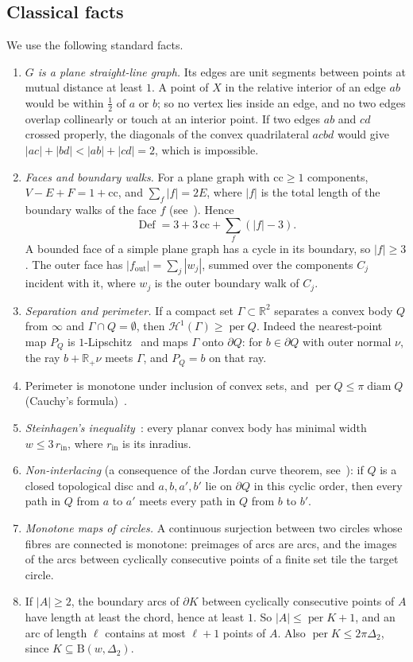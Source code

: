 \documentclass[11pt]{amsart}
\theoremstyle{definition}
\theoremstyle{remark}
\newcommand{\R}{\mathbb{R}}
\newcommand{\Dt}{\Delta_2}
\newcommand{\Dd}{\mathrm{B}}      %
\begin{document}
\subsection{Classical facts}
We use the following standard facts.
\begin{enumerate}[label=\textup{(P\arabic*)},leftmargin=3em]
\item \emph{$G$ is a plane straight-line graph.} Its edges are unit segments between points at mutual distance at least $1$. A point of $X$ in the relative interior of an edge $ab$ would be within $\frac12$ of $a$ or $b$; so no vertex lies inside an edge, and no two edges overlap collinearly or touch at an interior point. If two edges $ab$ and $cd$ crossed properly, the diagonals of the convex quadrilateral $acbd$ would give $|ac|+|bd|<|ab|+|cd|=2$, which is impossible.
\item \emph{Faces and boundary walks.} For a plane graph with $\mathrm{cc}\ge1$ components, $V-E+F=1+\mathrm{cc}$, and $\sum_f|f|=2E$, where $|f|$ is the total length of the boundary walks of the face $f$ (see~\cite{MoharThomassen}). Hence
\[
\operatorname{Def}=3+3\,\mathrm{cc}+\sum_f(|f|-3).
\]
A bounded face of a simple plane graph has a cycle in its boundary, so $|f|\ge3$. The outer face has $|f_{\mathrm{out}}|=\sum_j|w_j|$, summed over the components $C_j$ incident with it, where $w_j$ is the outer boundary walk of $C_j$.
\item \emph{Separation and perimeter.} If a compact set $\Gamma\subset\R^2$ separates a convex body $Q$ from $\infty$ and $\Gamma\cap Q=\emptyset$, then $\mathcal H^1(\Gamma)\ge\operatorname{per}Q$. Indeed the nearest-point map $P_Q$ is $1$-Lipschitz~\cite{Schneider} and maps $\Gamma$ onto $\partial Q$: for $b\in\partial Q$ with outer normal $\nu$, the ray $b+\R_+\nu$ meets $\Gamma$, and $P_Q=b$ on that ray.
\item Perimeter is monotone under inclusion of convex sets, and $\operatorname{per}Q\le\pi\operatorname{diam}Q$ (Cauchy's formula)~\cite{Schneider}.
\item \emph{Steinhagen's inequality}~\cite{Steinhagen}: every planar convex body has minimal width $w\le3\,r_{\mathrm{in}}$, where $r_{\mathrm{in}}$ is its inradius.
\item \emph{Non-interlacing} (a consequence of the Jordan curve theorem, see~\cite{MoharThomassen}): if $Q$ is a closed topological disc and $a,b,a',b'$ lie on $\partial Q$ in this cyclic order, then every path in $Q$ from $a$ to $a'$ meets every path in $Q$ from $b$ to $b'$.
\item \emph{Monotone maps of circles.} A continuous surjection between two circles whose fibres are connected is monotone: preimages of arcs are arcs, and the images of the arcs between cyclically consecutive points of a finite set tile the target circle.
\item If $|A|\ge2$, the boundary arcs of $\partial K$ between cyclically consecutive points of $A$ have length at least the chord, hence at least $1$. So $|A|\le\operatorname{per}K+1$, and an arc of length $\ell$ contains at most $\ell+1$ points of $A$. Also $\operatorname{per}K\le2\pi\Dt$, since $K\subseteq\Dd(w,\Dt)$.
\end{enumerate}
\end{document}
